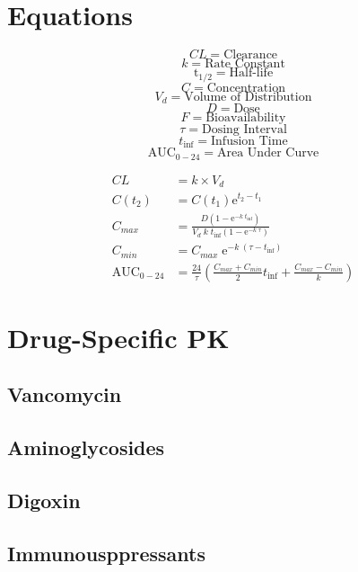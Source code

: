 \documentclass[main.tex]{subfiles}
\begin{document}
\newcommand{\cl}{CL}
\newcommand{\e}[1]{\mathrm{e}^{#1}}
\newcommand{\thl}{\mathrm{t}_{1/2}}
\newcommand{\tinf}{t_{\text{inf}}}

\section{Equations}
\begin{multicols}{3}
	$$\cl = \text{Clearance}$$
	$$k = \text{Rate Constant}$$
	$$\thl = \text{Half-life}$$
	$$C = \text{Concentration}$$
	$$V_d = \text{Volume of Distribution}$$
	$$D = \text{Dose}$$
	$$F = \text{Bioavailability}$$
	$$\tau = \text{Dosing Interval}$$
	$$\tinf = \text{Infusion Time}$$
	$$ \text{AUC}_{0 - 24} = \text{Area Under Curve} $$
\end{multicols}

\begin{align}
	\cl &= k\times V_d \\
	C(t_2) &= C(t_1) \e{t_2-t_1} \\
	C_{max} &= \frac{D \left(1-\e{-k \; \tinf}\right)}{V_d \; k \; \tinf \left(1-\e{-k \; \tau}\right)} \\
	C_{min} &= C_{max} \; \e{-k\; \left( \tau - \tinf \right)}\\
	\text{AUC}_{0 - 24} &= \frac{24}{\tau}\left( \frac{C_{max} + C_{min}}{2}\tinf + \frac{C_{max} - C_{min}}{k} \right)
\end{align}

\section{Drug-Specific PK}

\subsection{Vancomycin}

\subsection{Aminoglycosides}

\subsection{Digoxin}

\subsection{Immunousppressants}

\end{document}
